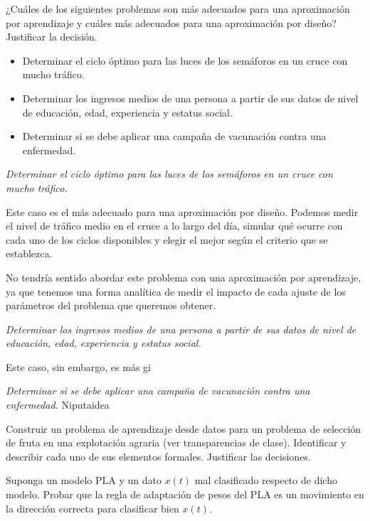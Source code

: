 \documentclass[a4paper, 11pt]{article}
\begin{document}
    \begin{ejercicio}
        ¿Cuáles de los siguientes problemas son más adecuados para una aproximación por aprendizaje y cuáles más adecuados para una aproximación por diseño? Justificar la decisión.
        \begin{itemize}
            \item Determinar el ciclo óptimo para las luces de los semáforos en un cruce con mucho tráfico.
            \item Determinar los ingresos medios de una persona a partir de sus datos de nivel de educación, edad, experiencia y estatus social.
            \item Determinar si se debe aplicar una campaña de vacunación contra una enfermedad.
        \end{itemize}
    \end{ejercicio}

    \begin{solucion}
        \emph{Determinar el ciclo óptimo para las luces de los semáforos en un cruce con mucho tráfico.}

        Este caso es el más adecuado para una aproximación por diseño. Podemos medir el nivel de tráfico medio en el cruce a lo largo del día, simular qué ocurre con cada uno de los ciclos disponibles y elegir el mejor según el criterio que se establezca.

        No tendría sentido abordar este problema con una aproximación por aprendizaje, ya que tenemos una forma analítica de medir el impacto de cada ajuste de los parámetros del problema que queremos obtener.

        \emph{Determinar los ingresos medios de una persona a partir de sus datos de nivel de educación, edad, experiencia y estatus social.}

        Este caso, sin embargo, es más gi

        \emph{Determinar si se debe aplicar una campaña de vacunación contra una enfermedad.}
        Niputaidea
    \end{solucion}

    \begin{ejercicio}
        Construir un problema de aprendizaje desde datos para un problema de selección de fruta en una explotación agraria (ver transparencias de clase). Identificar y describir cada uno de sus elementos formales. Justificar las decisiones.
    \end{ejercicio}

    \begin{ejercicio}
        Suponga un modelo PLA y un dato $x(t)$ mal clasificado respecto de dicho modelo. Probar que la regla de adaptación de pesos del PLA es un movimiento en la dirección correcta para clasificar bien $x(t)$.
    \end{ejercicio}
\end{document}
